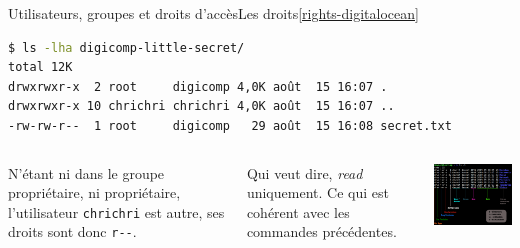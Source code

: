 \documentclass{beamer}
\begin{document}
    \begin{frame}[fragile]{Utilisateurs, groupes et droits d'accès}{Les droits\cref{rights-digitalocean}}
        \begin{lstlisting}[language=bash]
$ ls -lha digicomp-little-secret/
total 12K
drwxrwxr-x  2 root     digicomp 4,0K août  15 16:07 .
drwxrwxr-x 10 chrichri chrichri 4,0K août  15 16:07 ..
-rw-rw-r--  1 root     digicomp   29 août  15 16:08 secret.txt
        \end{lstlisting}
        \begin{columns}
            N'étant ni dans le groupe propriétaire, ni propriétaire, l'utilisateur \lstinline{chrichri} est autre, ses droits sont donc \lstinline{r--}.

            Qui veut dire, \textit{read} uniquement.
            Ce qui est cohérent avec les commandes précédentes.
            \begin{center}
                \includegraphics[width=6.5cm]{image/ls-details}
            \end{center}
        \end{columns}
    \end{frame}
\end{document}
